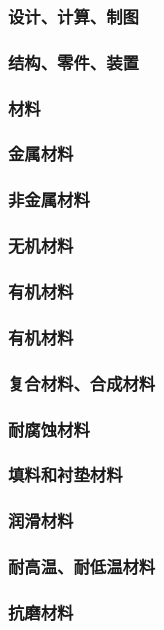 \documentclass[UTF8]{../../ApplicationUniverse}
\begin{document}
    \subsubsection{设计、计算、制图}
    \subsubsection{结构、零件、装置}
    \subsubsection{材料}
        \subsubsection{金属材料}
        \subsubsection{非金属材料}
            \subsubsection{无机材料}
            \subsubsection{有机材料}
            \subsubsection{有机材料}
        \subsubsection{复合材料、合成材料}
        \subsubsection{耐腐蚀材料}
        \subsubsection{填料和衬垫材料}
        \subsubsection{润滑材料}
        \subsubsection{耐高温、耐低温材料}
        \subsubsection{抗磨材料}
\end{document}
